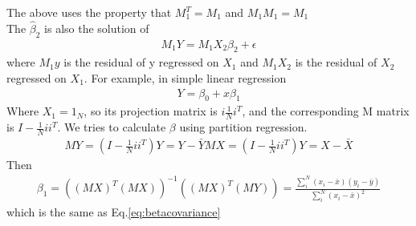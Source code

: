 \documentclass[a4paper]{article}
\begin{document}
The above uses the property that $M_1^T=M_1$ and $M_1 M_1 = M_1$\\
The $\hat \beta_2$ is also the solution of 
\begin{align*}
 M_1 Y = M_1 X_2 \beta_2 + \epsilon
\end{align*}
where $M_1 y$ is the residual of y regressed on $X_1$ and $M_1 X_2$ is the residual of $X_2$ regressed on $X_1$.
For example, in simple linear regression
\begin{align*}
Y= \beta_0 + x\beta_1
\end{align*}
Where $X_1=1_N$, so its projection matrix is $i\frac{1}{N}i^T$, and the corresponding M matrix is $I - \frac{1}{N}ii^T$.
We tries to calculate $\beta$ using partition regression. 
\begin{align*}
MY = (I-\frac{1}{N}ii^T)Y = Y-\bar Y
MX = (I-\frac{1}{N}ii^T)Y = X-\bar X
\end{align*}
Then
\begin{align}
\beta_1 = ((MX)^T(MX))^{-1}((MX)^T(MY))  = \frac{\sum_i^N(x_i - \bar x)(y_i - \bar y)}{\sum_i^N(x_i-\bar x)^2} \label{eq:beta_partition}
\end{align}
which is the same as Eq.\ref{eq:betacovariance}
\end{document}

